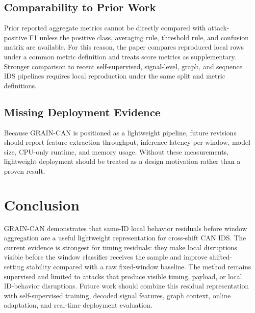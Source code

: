 \documentclass[runningheads]{llncs}
\newcommand{\method}{GRAIN-CAN}
\begin{document}
\subsection{Comparability to Prior Work}
Prior reported aggregate metrics cannot be directly compared with attack-positive F1 unless the positive class, averaging rule, threshold rule, and confusion matrix are available. For this reason, the paper compares reproduced local rows under a common metric definition and treats score metrics as supplementary. Stronger comparison to recent self-supervised, signal-level, graph, and sequence IDS pipelines requires local reproduction under the same split and metric definitions.

\subsection{Missing Deployment Evidence}
Because \method{} is positioned as a lightweight pipeline, future revisions should report feature-extraction throughput, inference latency per window, model size, CPU-only runtime, and memory usage. Without these measurements, lightweight deployment should be treated as a design motivation rather than a proven result.

\section{Conclusion}
\method{} demonstrates that same-ID local behavior residuals before window aggregation are a useful lightweight representation for cross-shift CAN IDS. The current evidence is strongest for timing residuals: they make local disruptions visible before the window classifier receives the sample and improve shifted-setting stability compared with a raw fixed-window baseline. The method remains supervised and limited to attacks that produce visible timing, payload, or local ID-behavior disruptions. Future work should combine this residual representation with self-supervised training, decoded signal features, graph context, online adaptation, and real-time deployment evaluation.
\end{document}
